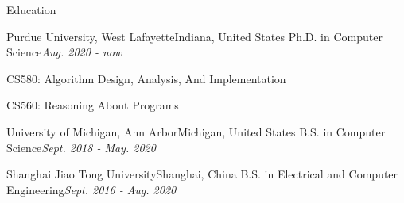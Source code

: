 \documentclass{resume} %
\begin{document}

\begin{rSection}{\large Education}
  \begin{rSubsection*}
    {Purdue University, West Lafayette}{Indiana, United States}
    {Ph.D. in Computer Science}{\textit{Aug. 2020 - now}}
  \item CS580: Algorithm Design, Analysis, And Implementation
  \item CS560: Reasoning About Programs
  \end{rSubsection*}

  \begin{rSubsection*}
    {University of Michigan, Ann Arbor}{Michigan, United States}
    {B.S. in Computer Science}{\textit{Sept. 2018 - May. 2020}}
  \end{rSubsection*}

  \begin{rSubsection*}{Shanghai Jiao Tong University}{Shanghai, China}
  {B.S. in Electrical and Computer Engineering}{\textit {Sept. 2016 - Aug. 2020}}
  \end{rSubsection*}

\end{rSection}
\end{document}
